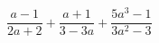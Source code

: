 \begin{ex}
	\begin{condition}
		\( \dfrac{a-1}{2a+2}+\dfrac{a+1}{3-3a}+\dfrac{5a^3-1}{3a^2-3} \)
	\end{condition}
\end{ex}